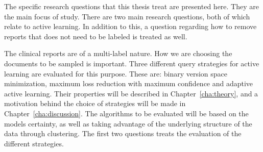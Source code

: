 The specific research questions that this thesis treat are presented here.
They are the main focus of study.
There are two main research questions, both of which relate to active learning.
In addition to this, a question regarding how to remove reports that does not need to be labeled is treated as well.

The clinical reports are of a multi-label nature.
How we are choosing the documents to be sampled is important.
Three different query strategies for active learning are evaluated for this purpose.
These are: binary version space minimization, maximum loss reduction with maximum confidence and adaptive active learning.
Their properties will be described in Chapter~\ref{cha:theory}, and a motivation behind the choice of strategies will be made in Chapter~\ref{cha:discussion}.
The algorithms to be evaluated will be based on the models certainty, as well as taking advantage of the underlying structure of the data through clustering.
The first two questions treats the evaluation of the different strategies.

